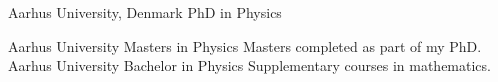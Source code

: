 \documentclass[%
               doublesided,
               paper=a4,
               fontsize=11pt
              ]{my-resume}
\begin{document}
{  
      {Aarhus University, Denmark}
      {PhD in Physics}
      {%



        
      }


      {Aarhus University}
      {Masters in Physics}
      {
        Masters completed as part of my PhD.
      }
      {Aarhus University}
      {Bachelor in Physics}
      {
     Supplementary courses in mathematics.
          }


    
    
}
\makebody
\clearpage
\end{document}
